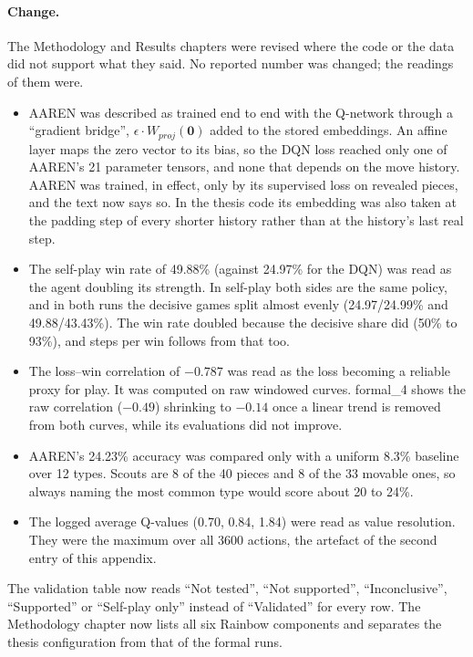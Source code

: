 \paragraph{Change.} The Methodology and Results chapters were revised where the code or the data
did not support what they said. No reported number was changed; the readings of them were.
\begin{itemize}
  \item AAREN was described as trained end to end with the Q-network through a ``gradient
        bridge'', $\epsilon \cdot W_{proj}(\mathbf{0})$ added to the stored embeddings. An affine
        layer maps the zero vector to its bias, so the DQN loss reached only one of AAREN's 21
        parameter tensors, and none that depends on the move history. AAREN was trained, in
        effect, only by its supervised loss on revealed pieces, and the text now says so. In the
        thesis code its embedding was also taken at the padding step of every shorter history
        rather than at the history's last real step.
  \item The self-play win rate of 49.88\% (against 24.97\% for the DQN) was read as the agent
        doubling its strength. In self-play both sides are the same policy, and in both runs the
        decisive games split almost evenly (24.97/24.99\% and 49.88/43.43\%). The win rate doubled
        because the decisive share did (50\% to 93\%), and steps per win follows from that too.
  \item The loss--win correlation of $-0.787$ was read as the loss becoming a reliable proxy for
        play. It was computed on raw windowed curves. formal\_4 shows the raw correlation
        ($-0.49$) shrinking to $-0.14$ once a linear trend is removed from both curves, while its
        evaluations did not improve.
  \item AAREN's 24.23\% accuracy was compared only with a uniform 8.3\% baseline over 12 types.
        Scouts are 8 of the 40 pieces and 8 of the 33 movable ones, so always naming the most
        common type would score about 20 to 24\%.
  \item The logged average Q-values (0.70, 0.84, 1.84) were read as value resolution. They were
        the maximum over all 3600 actions, the artefact of the second entry of this appendix.
\end{itemize}
The validation table now reads ``Not tested'', ``Not supported'', ``Inconclusive'', ``Supported''
or ``Self-play only'' instead of ``Validated'' for every row. The Methodology chapter now lists all six
Rainbow components and separates the thesis configuration from that of the formal runs.


